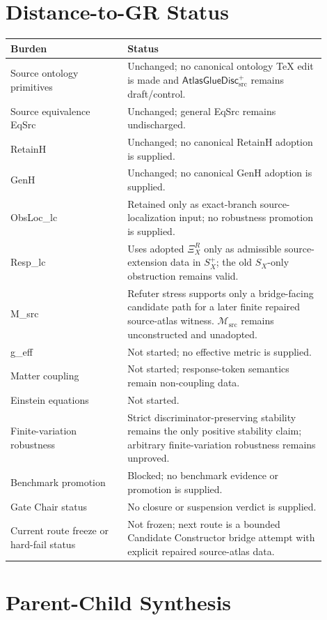 \documentclass[11pt]{article}
\newcommand{\Msrc}{\mathcal{M}_{\mathrm{src}}}
\newcommand{\XiR}{\Xi_X^R}
\newcommand{\SX}{S_X}
\newcommand{\Splus}{S_X^+}
\newcommand{\AtlasGlueDisc}{\mathsf{AtlasGlueDisc}_{\mathrm{src}}^{+}}
\begin{document}
\section{Distance-to-GR Status}

\begin{center}
\begin{tabular}{p{0.33\linewidth}p{0.57\linewidth}}
\hline
Burden & Status \\
\hline
Source ontology primitives & Unchanged; no canonical ontology TeX edit is made and \(\AtlasGlueDisc\) remains draft/control. \\
Source equivalence EqSrc & Unchanged; general EqSrc remains undischarged. \\
RetainH & Unchanged; no canonical RetainH adoption is supplied. \\
GenH & Unchanged; no canonical GenH adoption is supplied. \\
ObsLoc\_lc & Retained only as exact-branch source-localization input; no robustness promotion is supplied. \\
Resp\_lc & Uses adopted \(\XiR\) only as admissible source-extension data in \(\Splus\); the old \(\SX\)-only obstruction remains valid. \\
M\_src & Refuter stress supports only a bridge-facing candidate path for a later finite repaired source-atlas witness. \(\Msrc\) remains unconstructed and unadopted. \\
g\_eff & Not started; no effective metric is supplied. \\
Matter coupling & Not started; response-token semantics remain non-coupling data. \\
Einstein equations & Not started. \\
Finite-variation robustness & Strict discriminator-preserving stability remains the only positive stability claim; arbitrary finite-variation robustness remains unproved. \\
Benchmark promotion & Blocked; no benchmark evidence or promotion is supplied. \\
Gate Chair status & No closure or suspension verdict is supplied. \\
Current route freeze or hard-fail status & Not frozen; next route is a bounded Candidate Constructor bridge attempt with explicit repaired source-atlas data. \\
\hline
\end{tabular}
\end{center}

\section{Parent-Child Synthesis}
\end{document}
